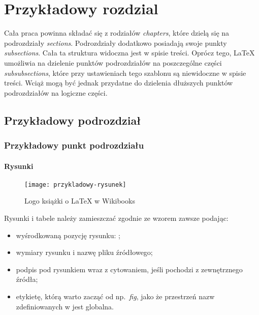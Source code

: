 \chapter{Przykładowy rozdzial}
\label{chpt:przykladowy-rozdzial}

Cała praca powinna składać się z rodziałów \emph{chapters}, które dzielą
się na podrozdziały \emph{sections}. Podrozdziały dodatkowo
posiadają swoje punkty \emph{subsections}. Cała ta struktura widoczna
jest w spisie treści. Oprócz tego, LaTeX umożliwia na dzielenie punktów
podrozdziałów na poszczególne części \emph{subsubsections}, które przy
ustawieniach tego szablonu są niewidoczne w spisie treści. Wciąż mogą
być jednak przydatne do dzielenia dłuższych punktów podrozdziałów na
logiczne części.

\section{Przykładowy podrozdział}

\subsection{Przykładowy punkt podrozdziału}

\subsubsection{Rysunki}

\begin{figure}[!htb]
    \centering
    \texttt{[image: przykladowy-rysunek]}
    \caption{Logo książki o LaTeX w Wikibooks
    \cite{book:latex}}
    \label{fig:przykladowy-rysunek}
\end{figure}

Rysunki i tabele należy zamieszczać zgodnie ze wzorem zawsze podając:

\begin{itemize}
    \item wyśrodkowaną pozycję rysunku: ;
    \item wymiary rysunku i nazwę pliku źródłowego;
    \item podpis pod rysunkiem wraz z cytowaniem, jeśli pochodzi
    z zewnętrznego źródła;
    \item etykietę, którą warto zacząć od np.\ \emph{fig}, jako że
    przestrzeń nazw zdefiniowanych w  jest
    globalna.
\end{itemize}


